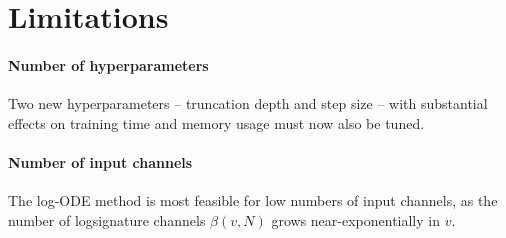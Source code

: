 \section{Limitations}

\paragraph{Number of hyperparameters} Two new hyperparameters -- truncation depth and step size -- with substantial effects on training time and memory usage must now also be tuned.

\paragraph{Number of input channels} The log-ODE method is most feasible for low numbers of input channels, as the number of logsignature channels $\beta(v, N)$ grows near-exponentially in $v$.